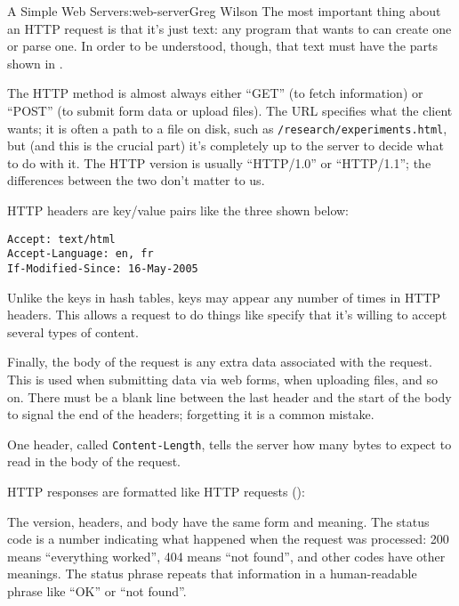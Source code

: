 \begin{aosachapter}{A Simple Web Server}{s:web-server}{Greg Wilson}
The most important thing about an HTTP request is that it's just text:
any program that wants to can create one or parse one. In order to be
understood, though, that text must have the parts shown in
.


The HTTP method is almost always either ``GET'' (to fetch information)
or ``POST'' (to submit form data or upload files). The URL specifies
what the client wants; it is often a path to a file on disk, such as
\texttt{/research/experiments.html}, but (and this is the crucial part)
it's completely up to the server to decide what to do with it. The HTTP
version is usually ``HTTP/1.0'' or ``HTTP/1.1''; the differences between
the two don't matter to us.

HTTP headers are key/value pairs like the three shown below:

\begin{verbatim}
Accept: text/html
Accept-Language: en, fr
If-Modified-Since: 16-May-2005
\end{verbatim}

Unlike the keys in hash tables, keys may appear any number of times in
HTTP headers. This allows a request to do things like specify that it's
willing to accept several types of content.

Finally, the body of the request is any extra data associated with the
request. This is used when submitting data via web forms, when uploading
files, and so on. There must be a blank line between the last header and
the start of the body to signal the end of the headers; forgetting it is
a common mistake.

One header, called \texttt{Content-Length}, tells the server how many
bytes to expect to read in the body of the request.

HTTP responses are formatted like HTTP requests
():


The version, headers, and body have the same form and meaning. The
status code is a number indicating what happened when the request was
processed: 200 means ``everything worked'', 404 means ``not found'', and
other codes have other meanings. The status phrase repeats that
information in a human-readable phrase like ``OK'' or ``not found''.


\end{aosachapter}
